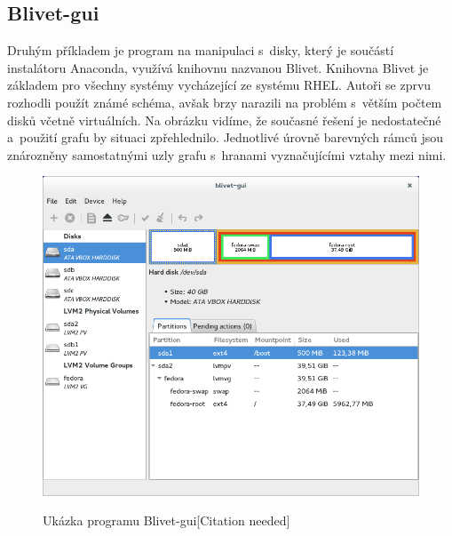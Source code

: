 \documentclass{report}
\begin{document}
\subsection{Blivet-gui}

Druhým příkladem je program na manipulaci s~disky, který je součástí instalátoru Anaconda, využívá knihovnu nazvanou Blivet. Knihovna Blivet je základem pro všechny systémy vycházející ze systému RHEL. Autoři 
se zprvu rozhodli použít známé schéma, avšak brzy narazili na problém s~větším počtem disků včetně virtuálních. Na obrázku vidíme, že současné řešení je nedostatečné a~použití grafu by
situaci zpřehlednilo. Jednotlivé úrovně barevných rámců jsou znározněny samostatnými uzly grafu s~hranami vyznačujícími vztahy mezi nimi. 

\begin{figure}[hb]
\label{fig:blivet}
\caption{Ukázka programu Blivet-gui[Citation needed]}
\centering
\includegraphics[width=.8\columnwidth]{pics/blivet-gui-1.png}\\
\end{figure}
\end{document}
